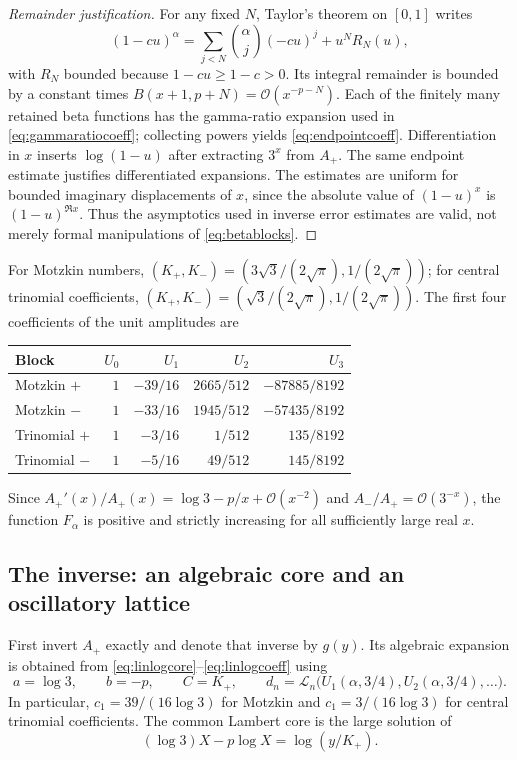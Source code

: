 \documentclass[11pt,a4paper]{article}
\theoremstyle{definition}
\theoremstyle{remark}
\newcommand{\OO}{\mathcal O}
\newcommand{\LogC}{\mathcal L}
\numberwithin{equation}{section}
\begin{document}
\begin{proof}[Remainder justification]
For any fixed $N$, Taylor's theorem on $[0,1]$ writes
\[
 (1-cu)^\alpha=\sum_{j<N}\binom\alpha j(-cu)^j+u^N R_N(u),
\]
with $R_N$ bounded because $1-cu\ge1-c>0$. Its integral remainder is bounded by a constant times $B(x+1,p+N)=\OO(x^{-p-N})$. Each of the finitely many retained beta functions has the gamma-ratio expansion used in \eqref{eq:gammaratiocoeff}; collecting powers yields \eqref{eq:endpointcoeff}. Differentiation in $x$ inserts $\log(1-u)$ after extracting $3^x$ from $A_+$. The same endpoint estimate justifies differentiated expansions. The estimates are uniform for bounded imaginary displacements of $x$, since the absolute value of $(1-u)^x$ is $(1-u)^{\Re x}$. Thus the asymptotics used in inverse error estimates are valid, not merely formal manipulations of \eqref{eq:betablocks}.
\end{proof}

For Motzkin numbers, $(K_+,K_-)=(3\sqrt3/(2\sqrt\pi),1/(2\sqrt\pi))$; for central trinomial coefficients, $(K_+,K_-)=(\sqrt3/(2\sqrt\pi),1/(2\sqrt\pi))$. The first four coefficients of the unit amplitudes are
\begin{center}
\begin{tabular}{@{}lrrrr@{}}
\toprule
Block & $U_0$ & $U_1$ & $U_2$ & $U_3$\\
\midrule
Motzkin $+$ & $1$ & $-39/16$ & $2665/512$ & $-87885/8192$\\
Motzkin $-$ & $1$ & $-33/16$ & $1945/512$ & $-57435/8192$\\
Trinomial $+$ & $1$ & $-3/16$ & $1/512$ & $135/8192$\\
Trinomial $-$ & $1$ & $-5/16$ & $49/512$ & $145/8192$\\
\bottomrule
\end{tabular}
\end{center}
Since $A_+'(x)/A_+(x)=\log3-p/x+\OO(x^{-2})$ and $A_-/A_+=\OO(3^{-x})$, the function $F_\alpha$ is positive and strictly increasing for all sufficiently large real $x$.

\subsection{The inverse: an algebraic core and an oscillatory lattice}
First invert $A_+$ exactly and denote that inverse by $g(y)$. Its algebraic expansion is obtained from \eqref{eq:linlogcore}--\eqref{eq:linlogcoeff} using
\begin{equation}
 a=\log3,\qquad b=-p,\qquad C=K_+,\qquad
 d_n=\LogC_n\bigl(U_1(\alpha,3/4),U_2(\alpha,3/4),\ldots\bigr).
 \label{eq:endpointinverseparams}
\end{equation}
In particular, $c_1=39/(16\log3)$ for Motzkin and $c_1=3/(16\log3)$ for central trinomial coefficients. The common Lambert core is the large solution of
\[
 (\log3)X-p\log X=\log(y/K_+).
\]
\end{document}

